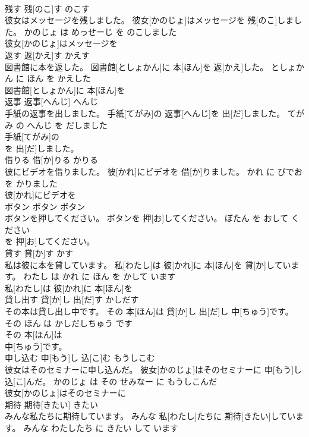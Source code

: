 \documentclass[8pt]{extreport}
\begin{document}
\begin{CJK}{UTF8}{min}
\\	残す	残[のこ]す	のこす	
\\	彼女はメッセージを残しました。	彼女[かのじょ]はメッセージを 残[のこ]しました。	かのじょ は めっせーじ を のこしました	
\\	彼女[かのじょ]はメッセージを
\\	返す	返[かえ]す	かえす	
\\	図書館に本を返した。	図書館[としょかん]に 本[ほん]を 返[かえ]した。	としょかん に ほん を かえした	
\\	図書館[としょかん]に 本[ほん]を
\\	返事	返事[へんじ]	へんじ	
\\	手紙の返事を出しました。	手紙[てがみ]の 返事[へんじ]を 出[だ]しました。	てがみ の へんじ を だしました	
\\	手紙[てがみ]の
\\	を 出[だ]しました。		
\\	借りる	借[か]りる	かりる	
\\	彼にビデオを借りました。	彼[かれ]にビデオを 借[か]りました。	かれ に びでお を かりました	
\\	彼[かれ]にビデオを
\\	ボタン	ボタン	ボタン	
\\	ボタンを押してください。	ボタンを 押[お]してください。	ぼたん を おして ください	
\\	を 押[お]してください。		
\\	貸す	貸[か]す	かす	
\\	私は彼に本を貸しています。	私[わたし]は 彼[かれ]に 本[ほん]を 貸[か]しています。	わたし は かれ に ほん を かして います	
\\	私[わたし]は 彼[かれ]に 本[ほん]を
\\	貸し出す	貸[か]し 出[だ]す	かしだす	
\\	その本は貸し出し中です。	その 本[ほん]は 貸[か]し 出[だ]し 中[ちゅう]です。	その ほん は かしだしちゅう です	
\\	その 本[ほん]は
\\	中[ちゅう]です。		
\\	申し込む	申[もう]し 込[こ]む	もうしこむ	
\\	彼女はそのセミナーに申し込んだ。	彼女[かのじょ]はそのセミナーに 申[もう]し 込[こ]んだ。	かのじょ は その せみなー に もうしこんだ	
\\	彼女[かのじょ]はそのセミナーに
\\	期待	期待[きたい]	きたい	
\\	みんな私たちに期待しています。	みんな 私[わたし]たちに 期待[きたい]しています。	みんな わたしたち に きたい して います	

\end{CJK}
\end{document}
